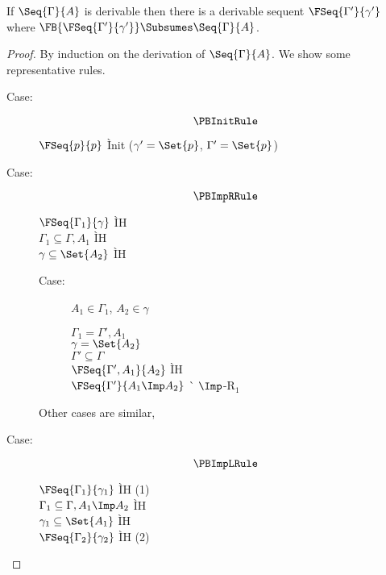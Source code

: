 
\begin{theorem}[Completeness]
  \label{prop.thm.forward-complete}
  If $\Seq{\Gamma}{A}$ is derivable then there is a derivable
  sequent $\FSeq{\Gamma'}{\gamma'}$ where
  $\FB{\FSeq{\Gamma'}{\gamma'}}\Subsumes \Seq{\Gamma}{A}$.
\end{theorem}

\begin{proof}
  By induction on the derivation of $\Seq{\Gamma}{A}$.
  We show some representative rules.
  \begin{description}
  \item[Case:]
    \[ \PBInitRule \]
    \begin{tabbing}
      $\FSeq{p}{p}$ \` Init ($\gamma'=\Set{p}$, $\Gamma'=\Set{p}$) \\
    \end{tabbing}
  \item[Case:]
    \[ \PBImpRRule \]
    \begin{tabbing}
      $\FSeq{\Gamma_1}{\gamma}$ \` IH \\
      $\Gamma_1 \subseteq \Gamma, A_1$ \` IH \\
      $\gamma \subseteq \Set{A_2}$ \` IH \\
    \end{tabbing}
    \begin{description}
    \item[Case:]
      $A_1\in\Gamma_1$, $A_2\in\gamma$
      \begin{tabbing}
        $\Gamma_1=\Gamma',A_1$ \\
        $\gamma=\Set{A_2}$ \\
        $\Gamma' \subseteq \Gamma$ \\
        $\FSeq{\Gamma',A_1}{A_2}$ \` IH \\
        $\FSeq{\Gamma'}{A_1\Imp A_2}$ \` $\Imp$-R$_1$ \\
      \end{tabbing}
    \end{description}
    Other cases are similar, %
  \item[Case:]
    \[ \PBImpLRule \]
    \begin{tabbing}
      $\FSeq{\Gamma_1}{\gamma_1}$ \` IH (1) \\
      $\Gamma_1\subseteq \Gamma, A_1\Imp A_2$ \` IH \\
      $\gamma_1\subseteq \Set{A_1}$ \` IH \\
      $\FSeq{\Gamma_2}{\gamma_2}$ \` IH (2) \\

\end{tabbing}
\end{description}
\end{proof}

